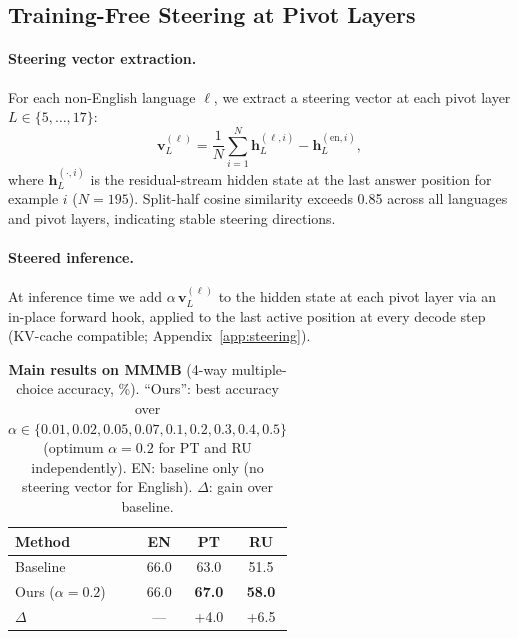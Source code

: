 \documentclass[11pt]{article}
\begin{document}
\subsection{Training-Free Steering at Pivot Layers}
\label{sec:steering}

\paragraph{Steering vector extraction.}
For each non-English language $\ell$, we extract a steering vector at each
pivot layer $L \in \{5,\ldots,17\}$:
\begin{equation}
  \mathbf{v}_L^{(\ell)}
  = \frac{1}{N}\sum_{i=1}^{N}
    \mathbf{h}_L^{(\ell,i)} - \mathbf{h}_L^{(\mathrm{en},i)},
\end{equation}
where $\mathbf{h}_L^{(\cdot,i)}$ is the residual-stream hidden state at the
last answer position for example $i$ ($N{=}195$).
Split-half cosine similarity exceeds 0.85 across all languages and pivot
layers, indicating stable steering directions.

\paragraph{Steered inference.}
At inference time we add $\alpha\,\mathbf{v}_L^{(\ell)}$ to the hidden state
at each pivot layer via an in-place forward hook, applied to the last active
position at every decode step (KV-cache compatible;
Appendix~\ref{app:steering}).

\begin{table}[t]
\centering
\small
\setlength{\tabcolsep}{5pt}
\caption{
  \textbf{Main results on MMMB} (4-way multiple-choice accuracy, \%).
  ``Ours'': best accuracy over
  $\alpha \in \{0.01, 0.02, 0.05, 0.07, 0.1, 0.2, 0.3, 0.4, 0.5\}$
  (optimum $\alpha{=}0.2$ for PT and RU independently).
  EN: baseline only (no steering vector for English).
  $\Delta$: gain over baseline.
}
\label{tab:main}
\begin{tabular}{lccc}
\toprule
\textbf{Method} & \textbf{EN} & \textbf{PT} & \textbf{RU} \\
\midrule
Baseline              & 66.0 & 63.0 & 51.5 \\
Ours ($\alpha{=}0.2$) & 66.0 & \textbf{67.0} & \textbf{58.0} \\
\midrule
$\Delta$              & ---  & +4.0 & +6.5 \\
\bottomrule
\end{tabular}
\end{table}
\end{document}
